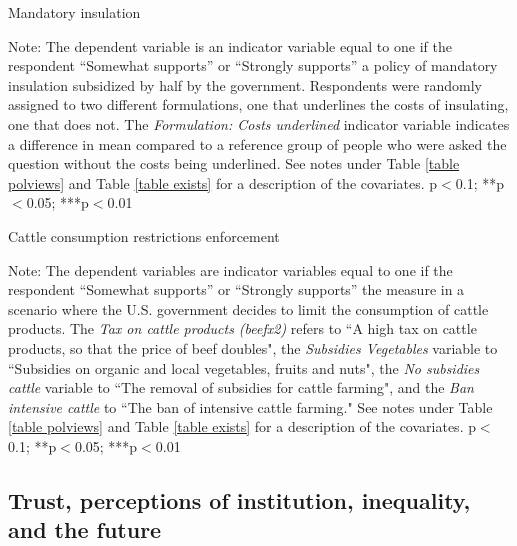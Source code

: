 \documentclass{article}
\begin{document}
\begin{landscape}
	\begin{table}[h!]
	\caption{Mandatory insulation}
	\begin{center}
		\scalebox{0.6}{}
	\end{center}
	{\footnotesize Note: The dependent variable is an indicator variable equal to one if the respondent ``Somewhat supports'' or ``Strongly supports'' a policy of mandatory insulation subsidized by half by the government. Respondents were randomly assigned to two different formulations, one that underlines the costs of insulating, one that does not. The \textit{Formulation: Costs underlined} indicator variable indicates a difference in mean compared to a reference group of people who were asked the question without the costs being underlined. See notes under Table \ref{table polviews} and Table \ref{table exists} for a description of the covariates.
	\newline *p$<$0.1; **p$<$0.05; ***p$<$0.01}
\end{table}	
\end{landscape}

\begin{table}[h!]
	\caption{Cattle consumption restrictions enforcement}
	\begin{center}
		\scalebox{0.7}{}
	\end{center}
	{\footnotesize Note: The dependent variables are indicator variables equal to one if the respondent ``Somewhat supports'' or ``Strongly supports'' the measure in a scenario where the U.S. government decides to limit the consumption of cattle products. The \textit{Tax on cattle products (beefx2)} refers to ``A high tax on cattle products, so that the price of beef doubles", the \textit{Subsidies Vegetables} variable to ``Subsidies on organic and local vegetables, fruits and nuts", the \textit{No subsidies cattle} variable to ``The removal of subsidies for cattle farming", and the \textit{Ban intensive cattle} to ``The ban of intensive cattle farming." See notes under Table \ref{table polviews} and Table \ref{table exists} for a description of the covariates.
	\newline *p$<$0.1; **p$<$0.05; ***p$<$0.01}
\end{table}	



\clearpage
\subsection{Trust, perceptions of institution, inequality, and the future}
\end{document}
